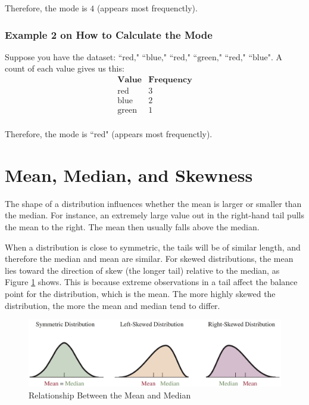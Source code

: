 Therefore, the mode is \( 4 \) (appears most frequenctly). 

\subsubsection*{Example 2 on How to Calculate the Mode}
Suppose you have the dataset: \( \text{“red," “blue," “red," “green," “red," “blue"} \). A count of each value gives us this: 
\[
\begin{array}{c|l}
\textbf{Value} & \textbf{Frequency} \\
\hline
\text{red} & 3 \\
\text{blue} & 2 \\
\text{green} & 1 \\
\end{array}
\]

Therefore, the mode is “red" (appears most frequenctly). 

\section{Mean, Median, and Skewness}
The shape of a distribution influences whether the mean is larger or smaller than the median. For instance, an extremely large value out in the right-hand tail pulls the mean to the right. The mean then usually falls above the median.

When a distribution is close to symmetric, the tails will be of similar length, and therefore the median and mean are similar. For skewed distributions, the mean lies toward the direction of skew (the longer tail) relative to the median, as Figure \ref{fig:skewness.jpg} shows. This is because extreme observations in a tail affect the balance point for the distribution, which is the mean. The more highly skewed the distribution, the more the mean and median tend to differ.

\begin{figure}[h!]
\centering
\includegraphics[width=1\textwidth]{figures/skewness.jpg}
\caption{Relationship Between the Mean and Median}
\label{fig:skewness.jpg}
\end{figure}

